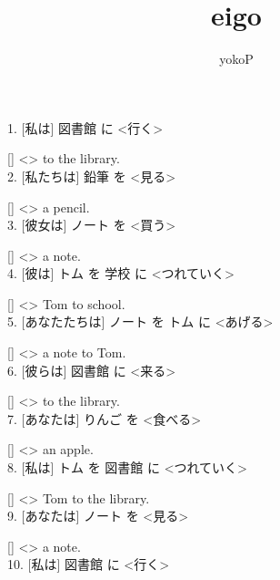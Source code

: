 \documentclass[uplatex,
paper=a4,
fontsize=18pt,
jafontsize=16pt,
number_of_lines=30,
line_length=30zh,
baselineskip=25pt,
]{jlreq}
\author{yokoP}
\title{eigo}
\begin{document}
1.  [私は] 図書館 に <行く>

  [\hspace{3em}] <\hspace{3em}> to the library.
\\

2.  [私たちは] 鉛筆 を <見る>

  [\hspace{3em}] <\hspace{3em}> a pencil.
\\

3.  [彼女は] ノート を <買う>

  [\hspace{3em}] <\hspace{3em}> a note.
\\

4.  [彼は] トム を 学校 に <つれていく>

  [\hspace{3em}] <\hspace{3em}> Tom to school.
\\

5.  [あなたたちは] ノート を トム に <あげる>

  [\hspace{3em}] <\hspace{3em}> a note to Tom.
\\

6.  [彼らは] 図書館 に <来る>

  [\hspace{3em}] <\hspace{3em}> to the library.
\\

7.  [あなたは] りんご を <食べる>

  [\hspace{3em}] <\hspace{3em}> an apple.
\\

8.  [私は] トム を 図書館 に <つれていく>

  [\hspace{3em}] <\hspace{3em}> Tom to the library.
\\

9.  [あなたは] ノート を <見る>

  [\hspace{3em}] <\hspace{3em}> a note.
\\

10.  [私は] 図書館 に <行く>
\end{document}
